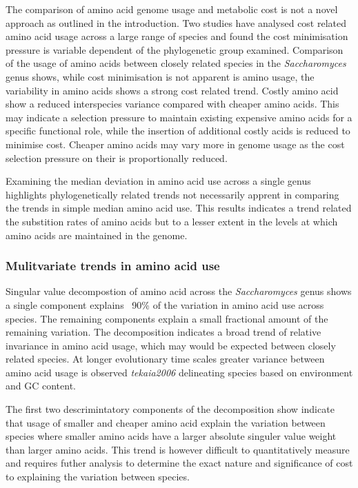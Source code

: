 The comparison of amino acid genome usage and metabolic cost is not a novel approach as outlined in the introduction. Two studies have analysed cost related amino acid usage across a large range of species \cite{seligmann2003,swire2007} and found the cost minimisation pressure is variable dependent of the phylogenetic group examined. Comparison of the usage of amino acids between closely related species in the \emph{Saccharomyces} genus shows, while cost minimisation is not apparent is amino usage, the variability in amino acids shows a strong cost related trend. Costly amino acid show a reduced interspecies variance compared with cheaper amino acids. This may indicate a selection pressure to maintain existing expensive amino acids for a specific functional role, while the insertion of additional costly acids is reduced to minimise cost. Cheaper amino acids may vary more in genome usage as the cost selection pressure on their is proportionally reduced.

Examining the median deviation in amino acid use across a single genus highlights phylogenetically related trends not necessarily apprent in comparing the trends in simple median amino acid use. This results indicates a trend related the substition rates of amino acids but to a lesser extent in the levels at which amino acids are maintained in the genome.

\subsubsection{Mulitvariate trends in amino acid use}

Singular value decompostion of amino acid across the \emph{Saccharomyces} genus shows a single component explains ~90\% of the variation in amino acid use across species. The remaining components explain a small fractional amount of the remaining variation. The decomposition indicates a broad trend of relative invariance in amino acid usage, which may would be expected between closely related species. At longer evolutionary time scales greater variance between amino acid usage is observed \emph{tekaia2006} delineating species based on environment and GC content.

The first two descrimintatory components of the decomposition show indicate that usage of smaller and cheaper amino acid explain the variation between species where smaller amino acids have a larger absolute singuler value weight than larger amino acids. This trend is however difficult to quantitatively measure and requires futher analysis to determine the exact nature and significance of cost to explaining the variation between species.


